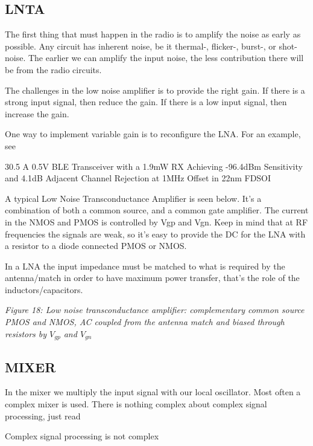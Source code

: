 \subsection{LNTA}\label{lnta}

The first thing that must happen in the radio is to amplify the noise as
early as possible. Any circuit has inherent noise, be it thermal-,
flicker-, burst-, or shot-noise. The earlier we can amplify the input
noise, the less contribution there will be from the radio circuits.

The challenges in the low noise amplifier is to provide the right gain.
If there is a strong input signal, then reduce the gain. If there is a
low input signal, then increase the gain.

One way to implement variable gain is to reconfigure the LNA. For an
example, see

30.5 A 0.5V BLE Transceiver with a 1.9mW RX Achieving -96.4dBm
Sensitivity and 4.1dB Adjacent Channel Rejection at 1MHz Offset in 22nm
FDSOI 

A typical Low Noise Transconductance Amplifier is seen below. It's a
combination of both a common source, and a common gate amplifier. The
current in the NMOS and PMOS is controlled by Vgp and Vgn. Keep in mind
that at RF frequencies the signals are weak, so it's easy to provide the
DC for the LNA with a resistor to a diode connected PMOS or NMOS.

In a LNA the input impedance must be matched to what is required by the
antenna/match in order to have maximum power transfer, that's the role
of the inductors/capacitors.


{
\centering
{}
}

\emph{Figure 18: Low noise transconductance amplifier: complementary
common source PMOS and NMOS, AC coupled from the antenna match and
biased through resistors by \(V_{gp}\) and \(V_{gn}\)}

\subsection{MIXER}\label{mixer}

In the mixer we multiply the input signal with our local oscillator.
Most often a complex mixer is used. There is nothing complex about
complex signal processing, just read

Complex signal processing is not complex

